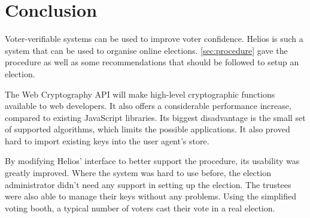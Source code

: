 % 
%

\section{Conclusion}

Voter-verifiable systems can be used to improve voter confidence. Helios is such a system that can be used to organise online elections. \ref{sec:procedure} gave the procedure as well as some recommendations that should be followed to setup an election.

\par The Web Cryptography API will make high-level cryptographic functions available to web developers. It also offers a considerable performance increase, compared to existing JavaScript libraries. Its biggest disadvantage is the small set of supported algorithms, which limits the possible applications. It also proved hard to import existing keys into the user agent's store.

\par By modifying Helios' interface to better support the procedure, its usability was greatly improved. Where the system was hard to use before, the election administrator didn't need any support in setting up the election. The trustees were also able to manage their keys without any problems. Using the simplified voting booth, a typical number of voters cast their vote in a real election.